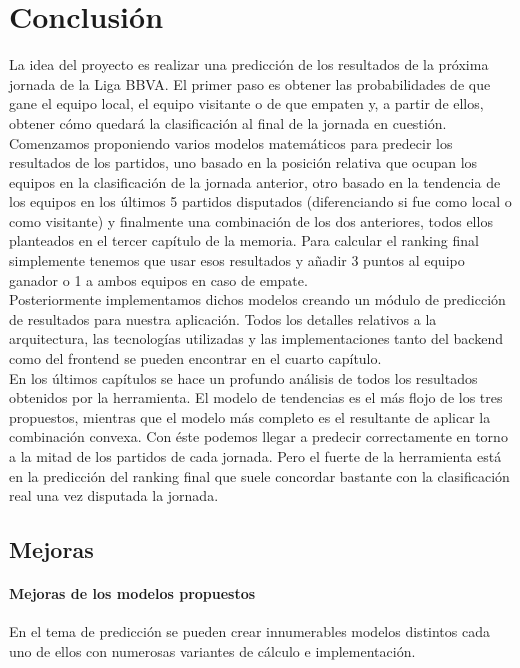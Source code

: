 \chapter{Conclusión}

La idea del proyecto es realizar una predicción de los resultados de la próxima jornada de la Liga BBVA. El primer paso es obtener las probabilidades de que gane el equipo local, el equipo visitante o de que empaten y, a partir de ellos, obtener cómo quedará la clasificación al final de la jornada en cuestión.\\

Comenzamos proponiendo varios modelos matemáticos para predecir los resultados de los partidos, uno basado en la posición relativa que ocupan los equipos en la clasificación de la jornada anterior, otro basado en la tendencia de los equipos en los últimos 5 partidos disputados (diferenciando si fue como local o como visitante) y finalmente una combinación de los dos anteriores, todos ellos planteados en el tercer capítulo de la memoria. Para calcular el ranking final simplemente tenemos que usar esos resultados y añadir 3 puntos al equipo ganador o 1 a ambos equipos en caso de empate.\\
 
Posteriormente implementamos dichos modelos creando un módulo de predicción de resultados para nuestra aplicación. Todos los detalles relativos a la arquitectura, las tecnologías utilizadas y las implementaciones tanto del backend como del frontend se pueden encontrar en el cuarto capítulo.\\  

En los últimos capítulos se hace un profundo análisis de todos los resultados obtenidos por la herramienta. El modelo de tendencias es el más flojo de los tres propuestos, mientras que el modelo más completo es el resultante de aplicar la combinación convexa. Con éste podemos llegar a predecir correctamente  en torno a la mitad de los partidos de cada jornada. Pero el fuerte de la herramienta está en la predicción del ranking final que suele concordar bastante con la clasificación real una vez disputada la jornada.\\

\newpage

\section{Mejoras}

\subsubsection*{Mejoras de los modelos propuestos}
En el tema de predicción se pueden crear innumerables modelos distintos cada uno de ellos con numerosas variantes de cálculo e implementación. \\

